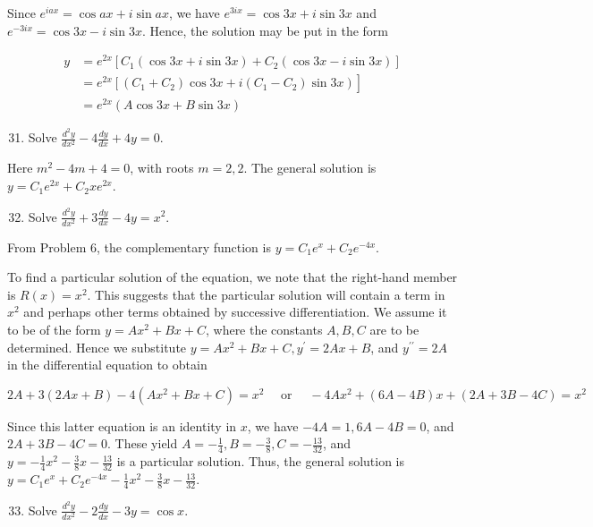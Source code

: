 \documentclass[10pt]{article}
\begin{document}
Since $e^{i a x}=\cos a x+i \sin a x$, we have $e^{3 i x}=\cos 3 x+i \sin 3 x$ and $e^{-3 i x}=\cos 3 x-i \sin 3 x$. Hence, the solution may be put in the form

$$
\begin{aligned}
y & =e^{2 x}\left[C_{1}(\cos 3 x+i \sin 3 x)+C_{2}(\cos 3 x-i \sin 3 x)\right] \\
& \left.=e^{2 x}\left[\left(C_{1}+C_{2}\right) \cos 3 x+i\left(C_{1}-C_{2}\right) \sin 3 x\right)\right] \\
& =e^{2 x}(A \cos 3 x+B \sin 3 x)
\end{aligned}
$$

\begin{enumerate}
  \setcounter{enumi}{30}
  \item Solve $\frac{d^{2} y}{d x^{2}}-4 \frac{d y}{d x}+4 y=0$.
\end{enumerate}

Here $m^{2}-4 m+4=0$, with roots $m=2,2$. The general solution is $y=C_{1} e^{2 x}+C_{2} x e^{2 x}$.

\begin{enumerate}
  \setcounter{enumi}{31}
  \item Solve $\frac{d^{2} y}{d x^{2}}+3 \frac{d y}{d x}-4 y=x^{2}$.
\end{enumerate}

From Problem 6, the complementary function is $y=C_{1} e^{x}+C_{2} e^{-4 x}$.

To find a particular solution of the equation, we note that the right-hand member is $R(x)=x^{2}$. This suggests that the particular solution will contain a term in $x^{2}$ and perhaps other terms obtained by successive differentiation. We assume it to be of the form $y=A x^{2}+B x+C$, where the constants $A, B, C$ are to be determined. Hence we substitute $y=A x^{2}+B x+C, y^{\prime}=2 A x+B$, and $y^{\prime \prime}=2 A$ in the differential equation to obtain

$$
2 A+3(2 A x+B)-4\left(A x^{2}+B x+C\right)=x^{2} \quad \text { or } \quad-4 A x^{2}+(6 A-4 B) x+(2 A+3 B-4 C)=x^{2}
$$

Since this latter equation is an identity in $x$, we have $-4 A=1,6 A-4 B=0$, and $2 A+3 B-4 C=0$. These yield $A=-\frac{1}{4}, B=-\frac{3}{8}, C=-\frac{13}{32}$, and $y=-\frac{1}{4} x^{2}-\frac{3}{8} x-\frac{13}{32}$ is a particular solution. Thus, the general solution is $y=C_{1} e^{x}+C_{2} e^{-4 x}-\frac{1}{4} x^{2}-\frac{3}{8} x-\frac{13}{32}$.

\begin{enumerate}
  \setcounter{enumi}{32}
  \item Solve $\frac{d^{2} y}{d x^{2}}-2 \frac{d y}{d x}-3 y=\cos x$.
\end{enumerate}
\end{document}
